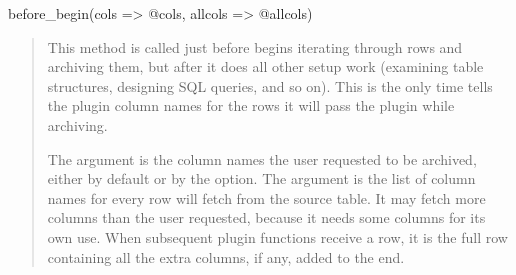 \documentclass[letterpaper,10pt,english]{sphinxmanual}
\begin{document}
\sphinxAtStartPar
before\_begin(cols =\textgreater{} @cols, allcols =\textgreater{} @allcols)
\begin{quote}

\sphinxAtStartPar
This method is called just before  begins iterating through rows
and archiving them, but after it does all other setup work (examining table
structures, designing SQL queries, and so on).  This is the only time
 tells the plugin column names for the rows it will pass the
plugin while archiving.

\sphinxAtStartPar
The  argument is the column names the user requested to be archived,
either by default or by the {\hyperref[\detokenize{mariadb-archiver:cmdoption-mariadb-archiver-columns}]{}} option.  The  argument is
the list of column names for every row  will fetch from the source
table.  It may fetch more columns than the user requested, because it needs some
columns for its own use.  When subsequent plugin functions receive a row, it is
the full row containing all the extra columns, if any, added to the end.
\end{quote}
\end{document}
